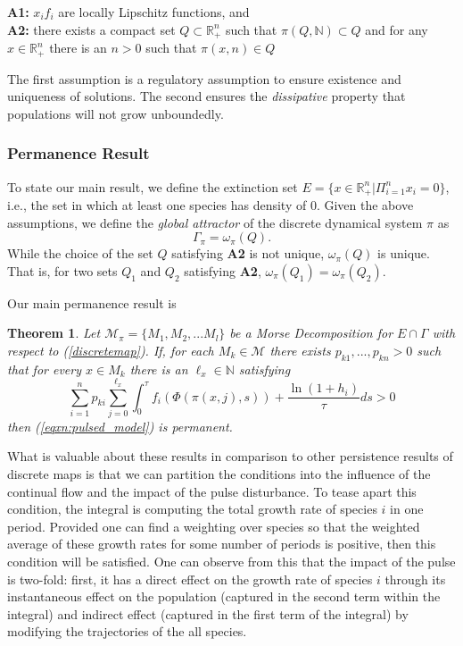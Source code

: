 \documentclass{article}
\newtheorem{theorem}{Theorem}[section]
\theoremstyle{definition}
\newcommand{\R}{{\mathbb{R}}}
\newcommand{\N}{{\mathbb{N}}}
\begin{document}
\noindent \textbf{A1:} $x_if_i$ are locally Lipschitz functions, and\\
\noindent \textbf{A2:} there exists a compact set $Q \subset \R^n_+$ such that $\pi(Q, \N) \subset Q$ and for any $x\in \R^n_+$ there is an $n>0$ such that $\pi(x, n) \in Q$

The first assumption is a regulatory assumption to ensure existence and uniqueness of solutions. The second ensures the \emph{dissipative} property that populations will not grow unboundedly.






\subsubsection{Permanence Result}

To state our main result, we define the extinction set $E = \{x\in \R^n_+ | \Pi_{i=1}^n x_i = 0 \}$, i.e., the set in which at least one species has density of 0.  
Given the above assumptions, we define the \emph{global attractor} of the discrete dynamical system $\pi$ as $$\Gamma_\pi = \omega_\pi(Q).$$
While the choice of the set $Q$ satisfying \textbf{A2} is not unique, $\omega_\pi(Q)$ is unique.  That is, for two sets $Q_1$ and $Q_2$ satisfying \textbf{A2}, $\omega_\pi(Q_1)=\omega_\pi(Q_2)$. 

Our main permanence result is



\begin{theorem} \label{thm:main}
  Let $\mathcal{M}_\pi = \{M_1, M_2,... M_l\}$ be a Morse Decomposition for $E \cap \Gamma$ with respect to (\ref{discretemap}). If, for each $M_k\in \mathcal{M}$ there exists $p_{k1},..., p_{kn} > 0$ such that for every $x \in M_k$ there is an $\ell_x \in \mathbb{N}$ satisfying
    \begin{equation}\label{eqxn:persistence_inequality_pulsed}
        \sum^n_{i=1} p_{ki} \sum^{\ell_x}_{j=0} \int_0^\tau f_i(\Phi(\pi(x,j),s)) + \frac{\ln{(1+h_i)}}{\tau} ds > 0
    \end{equation}
    then (\ref{eqxn:pulsed_model}) is permanent.
\end{theorem}

What is valuable about these results in comparison to other persistence results of discrete maps is that we can partition the conditions into the influence of the continual flow and the impact of the pulse disturbance.  
To tease apart this condition, the integral is computing the total growth rate of species $i$ in one period. Provided one can find a weighting over species so that the weighted average of these growth rates for some number of periods is positive, then this condition will be satisfied.  One can observe from this that the impact of the pulse is two-fold: first, it has a direct effect on the growth rate of species $i$ through its instantaneous effect on the population (captured in the second term within the integral) and indirect effect (captured in the first term of the integral) by modifying the trajectories of the all species. 
\end{document}
